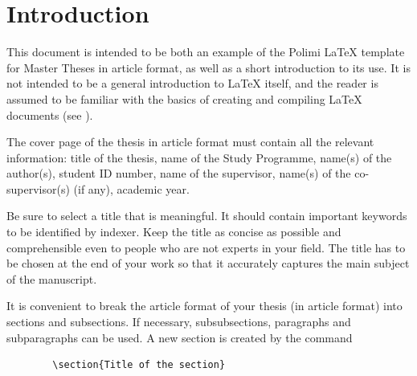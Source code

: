 \documentclass[11pt,a4paper]{article}
\begin{document}



\section{Introduction} \label{sec:introduction}

    This document is intended to be both an example of the Polimi \LaTeX{} template for Master Theses in article format, as well as a short introduction to its use. It is not intended to be a general introduction to \LaTeX{} itself, and the reader is assumed to be familiar with the basics of creating and compiling \LaTeX{} documents (see \cite{oetiker1995not, kottwitz2015latex}). 

    The cover page of the thesis in article format must contain all the relevant information: title of the thesis, name of the Study Programme, name(s) of the author(s),
    student ID number, name of the supervisor, name(s) of the co-supervisor(s) (if any), academic year.

    Be sure to select a title that is meaningful. It should contain important keywords to be identified by indexer. Keep the title as concise as possible and comprehensible even to people who are not experts in your field. The title has to be chosen at the end of your work so that it accurately captures the main subject of the manuscript.

    It is convenient to break the article format of your thesis (in article format) into sections and subsections. If necessary, subsubsections, paragraphs and subparagraphs can be used. A new section is created by the command

    \begin{verbatim}
        \section{Title of the section}
    \end{verbatim}
\end{document}
